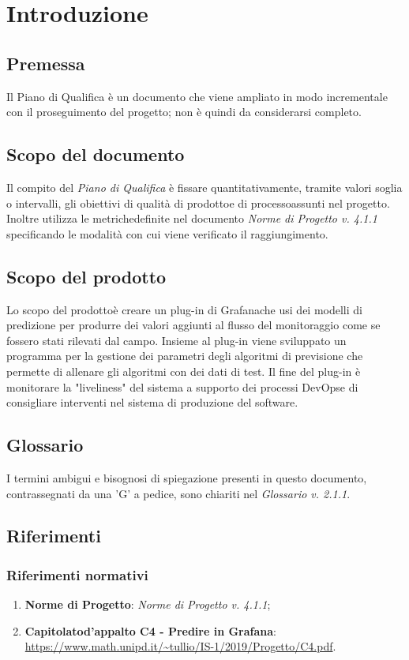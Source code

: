 \section{Introduzione}
	\subsection{Premessa}
	Il Piano di Qualifica è un documento che viene ampliato in modo incrementale con il proseguimento del progetto\glo; non è quindi da considerarsi completo.
	
	\subsection{Scopo del documento}
	Il compito del \textit{Piano di Qualifica} è fissare quantitativamente, tramite valori soglia o intervalli, gli obiettivi di qualità di prodotto\glosp e di processo\glosp assunti nel progetto\glo. Inoltre utilizza le metriche\glosp definite nel documento \textit{Norme di Progetto v. 4.1.1} specificando le modalità con cui viene verificato il raggiungimento.

	\subsection{Scopo del prodotto}
	Lo scopo del prodotto\glosp è creare un plug-in di Grafana\glosp che usi dei modelli di predizione per produrre dei valori aggiunti al flusso del monitoraggio come se fossero stati rilevati dal campo. Insieme al plug-in viene sviluppato un programma per la gestione dei parametri degli algoritmi di previsione che permette di allenare gli algoritmi con dei dati di test. Il fine del plug-in è monitorare la "liveliness" del sistema a supporto dei processi DevOps\glosp e di consigliare interventi nel sistema di produzione del software.
	
	\subsection{Glossario}
	I termini ambigui e bisognosi di spiegazione presenti in questo documento, contrassegnati da una 'G' a pedice, sono chiariti nel \textit{Glossario v. 2.1.1}.
	
	\subsection{Riferimenti}
		\subsubsection{Riferimenti normativi}
		\begin{enumerate}
			\item \textbf{Norme di Progetto}: \textit{Norme di Progetto v. 4.1.1};
			\item \textbf{Capitolato}\glosp \textbf{d'appalto C4 - Predire in Grafana}\glo: \url{https://www.math.unipd.it/~tullio/IS-1/2019/Progetto/C4.pdf}.
		\end{enumerate}
	
